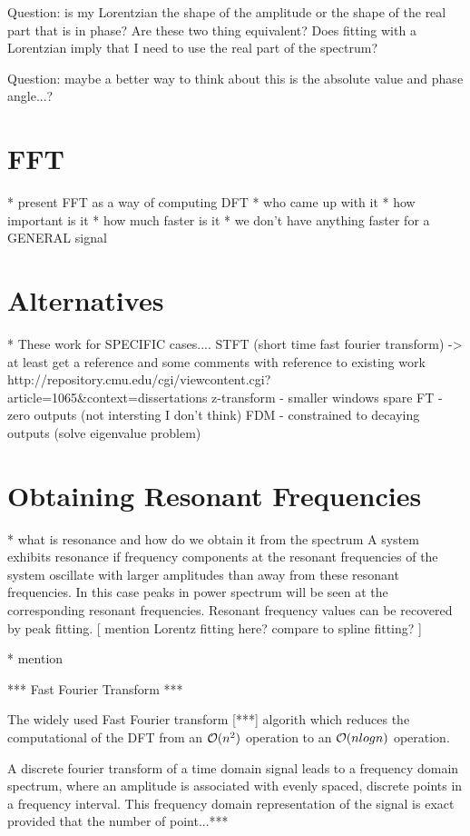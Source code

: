 Question: is my Lorentzian the shape of the amplitude or the shape of the real
part that is in phase? Are these two thing equivalent? Does fitting with a
Lorentzian imply that I need to use the real part of the spectrum?

Question: maybe a better way to think about this is the absolute value and phase
angle...?

\section{FFT} * present FFT as a way of computing DFT * who came up with it *
how important is it * how much faster is it * we don't have anything faster for
a GENERAL signal

\section{Alternatives} * These work for SPECIFIC cases.... STFT (short time fast
fourier transform) -> at least get a reference and some comments with reference
to existing work %
http://repository.cmu.edu/cgi/viewcontent.cgi?article=1065&context=dissertations
z-transform - smaller windows spare FT - zero outputs (not intersting I don't
think) FDM - constrained to decaying outputs (solve eigenvalue problem)


\section{Obtaining Resonant Frequencies} * what is resonance and how do we
obtain it from the spectrum A system exhibits resonance if frequency components
at the resonant frequencies of the system oscillate with larger amplitudes than
away from these resonant frequencies. In this case peaks in power spectrum will
be seen at the corresponding resonant frequencies. Resonant frequency values can
be recovered by peak fitting. [ mention Lorentz fitting here? compare to spline
fitting? ]

* mention

*** Fast Fourier Transform ***

The widely used Fast Fourier transform [***] algorith which reduces the
computational of the DFT from an $\mathcal{O}(n^2)$ operation to an $\mathcal{O}(n log n)$
operation.

A discrete fourier transform of a time domain signal leads to a frequency domain
spectrum, where an amplitude is associated with evenly spaced, discrete points
in a frequency interval. This frequency domain representation of the signal is
exact provided that the number of point...***

